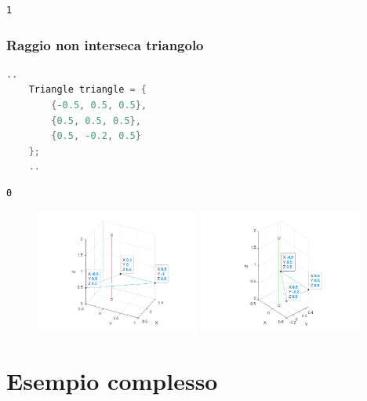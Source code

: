 \documentclass[a4paper]{article}
\begin{document}
\begin{lstlisting}[language=bash,backgroundcolor=\color{black},basicstyle=\ttfamily\footnotesize\color{green}]
    1
\end{lstlisting}

\subsubsection{Raggio non interseca triangolo}

\begin{lstlisting}[language=c++]
    ..
    Triangle triangle = {
        {-0.5, 0.5, 0.5},
        {0.5, 0.5, 0.5},
        {0.5, -0.2, 0.5}
    };
    .. 
\end{lstlisting}

\begin{lstlisting}[language=bash,backgroundcolor=\color{black},basicstyle=\ttfamily\footnotesize\color{green}]
    0
\end{lstlisting}

\begin{figure}[ht]
    \centering
    \includegraphics[width=0.48\textwidth]{images/intersect.png}
    \includegraphics[width=0.48\textwidth]{images/notintersect.png}
\end{figure}

\newpage

\section{Esempio complesso}
\end{document}
